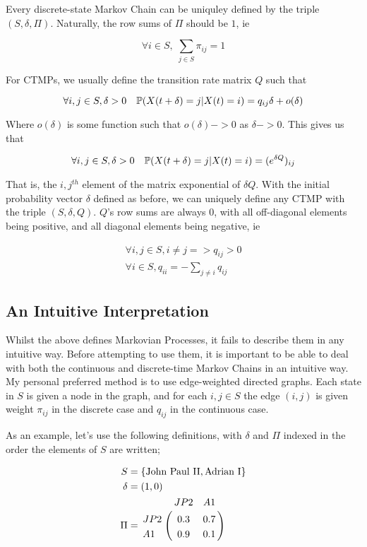 Every discrete-state Markov Chain can be uniquley defined by the triple $(S,\delta,\Pi)$. Naturally, the row sums of $\Pi$ should be $1$, ie

$$
\forall i \in S, \; \sum_{j \in S} \pi_{ij} = 1
$$

For CTMPs, we usually define the transition rate matrix $Q$ such that

$$
\forall i,j \in S, \delta>0 \quad \mathbb{P} (X(t+\delta)=j|X(t)=i) = q_{ij}\delta + o(\delta)
$$

Where $o(\delta)$ is some function such that $o(\delta) -> 0$ as $\delta -> 0$. This gives us that

$$
\forall i,j \in S, \delta>0 \quad \mathbb{P} (X(t+\delta)=j|X(t)=i) = (e^{\delta Q})_{ij}
$$

That is, the $i,j^{th}$ element of the matrix exponential of $\delta Q$. With the initial probability vector $\delta$ defined as before, we can uniquely define any CTMP with the triple $(S,\delta,Q)$. $Q$'s row sums are always 0, with all off-diagonal elements being positive, and all diagonal elements being negative, ie

\begin{align*}
\forall i,j \in S, i \neq j => q_{ij} > 0 \\
\forall i \in S, q_{ii} = -\sum_{j \neq i} q_{ij}
\end{align*}

\subsection{An Intuitive Interpretation}

Whilst the above defines Markovian Processes, it fails to describe them in any intuitive way. Before attempting to use them, it is important to be able to deal with both the continuous and discrete-time Markov Chains in an intuitive way. My personal preferred method is to use edge-weighted directed graphs\cite{mwgraph}. Each state in $S$ is given a node in the graph, and for each $i,j \in S$ the edge $(i,j)$ is given weight $\pi_{ij}$ in the discrete case and $q_{ij}$ in the continuous case.

As an example, let's use the following definitions, with $\delta$ and $\Pi$ indexed in the order the elements of $S$ are written;

\begin{align*}
S &= \{\mbox{John Paul II}, \mbox{Adrian I}\}\\
\delta &= \left(1,0\right)\\
\Pi &=
\bordermatrix{      & JP2&A1 \cr
                JP2 & 0.3 &  0.7 \cr
                A1  & 0.9 &  0.1 
			}
\end{align*}

